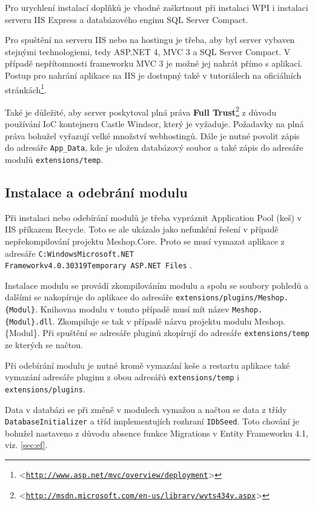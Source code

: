 \documentclass[11pt,twoside,a4paper]{book}
\let\oldUrl\url
\renewcommand\url[1]{<\texttt{\oldUrl{#1}}>}
\begin{document}
Pro urychlení instalací doplňků je vhodné zaškrtnout při instalaci WPI i instalaci serveru IIS Express a databázového enginu SQL Server Compact.

Pro spuštění na serveru IIS nebo na hostingu je třeba, aby byl server vybaven stejnými technologiemi, tedy ASP.NET 4, MVC 3 a SQL Server Compact. V případě nepřítomnosti frameworku MVC 3 je možné jej nahrát přímo s aplikací. Postup pro nahrání aplikace na IIS je dostupný také v tutoriálech na oficiálních stránkách\footnote{\url{http://www.asp.net/mvc/overview/deployment}}.

Také je důležité, aby server poskytoval plná práva \textbf{Full Trust}\footnote{\url{http://msdn.microsoft.com/en-us/library/wyts434y.aspx}} z důvodu používání IoC kontejneru Castle Windsor, který je vyžaduje. Požadavky na plná práva bohužel vyřazují velké množství webhostingů. Dále je nutné povolit zápis do adresáře \texttt{App\_Data}, kde je uložen databázový soubor a také zápis do adresáře modulů \texttt{extensions/temp}.



\subsection{Instalace a odebrání modulu}
\label{sec:instalace}
Při instalaci nebo odebírání modulů je třeba vypráznit \textsf{Application Pool} (keš) v IIS příkazem \textsf{Recycle}. Toto se ale ukázalo jako nefunkční řešení v případě nepřekompilování projektu \textsf{Meshop.Core}. Proto se musí vymazat aplikace z adresáře \texttt{C:WindowsMicrosoft.NET\\Frameworkv4.0.30319Temporary ASP.NET Files} .

Instalace modulu se provádí zkompilováním modulu a spolu se soubory pohledů a dalšími se nakopíruje do aplikace do adresáře \texttt{extensions/plugins/Meshop.\{Modul\}}. Knihovna modulu v tomto případě musí mít název \texttt{Meshop.\{Modul\}.dll}. Zkompiluje se tak v případě názvu projektu modulu \textsf{Meshop.\{Modul\}}. Při spuštění se adresáře pluginů zkopírují do adresáře \texttt{extensions/temp} ze kterých se načtou.

Při odebírání modulu je nutné kromě vymazání keše a restartu aplikace také vymazání adresáře pluginu z obou adresářů \texttt{extensions/temp} i \texttt{extensions/plugins}.

Data v databázi se při změně v modulech vymažou a načtou se data z třídy \texttt{Database\-Initializer} a tříd implementujích rozhraní \texttt{IDbSeed}. Toto chování je bohužel nastaveno z důvodu absence funkce \textsf{Migrations} v Entity Frameworku 4.1, viz. \ref{sec:ef}.
\end{document}
